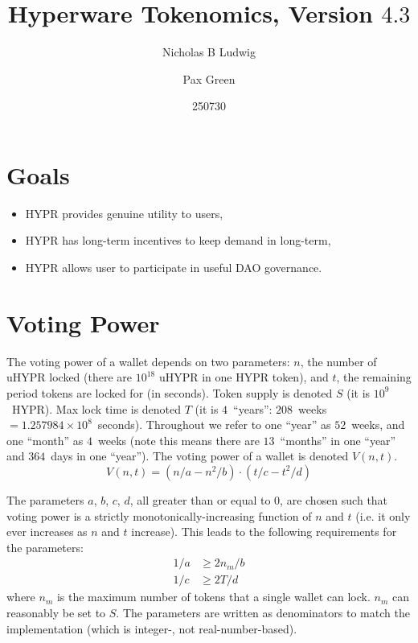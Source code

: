 \documentclass{article}
\title{Hyperware Tokenomics, Version $4.3$}
\date{250730}
\author{Nicholas B Ludwig \and Pax Green}
\begin{document}
\maketitle

\section{Goals}\label{sec:goals}
\begin{itemize}
    \item HYPR provides genuine utility to users,
    \item HYPR has long-term incentives to keep demand in long-term,
    \item HYPR allows user to participate in useful DAO governance.
\end{itemize}

\section{Voting Power}\label{sec:votingpower}

The voting power of a wallet depends on two parameters: $n$, the number of uHYPR locked (there are $10^{18}$ uHYPR in one HYPR token), and $t$, the remaining period tokens are locked for (in seconds).
Token supply is denoted $S$ (it is $10^9$~HYPR).
Max lock time is denoted $T$ (it is $4$~``years'': $208$~weeks $= 1.257984\times 10^8$~seconds).
Throughout we refer to one ``year'' as $52$~weeks, and one ``month'' as $4$~weeks (note this means there are $13$~``months'' in one ``year'' and $364$~days in one ``year'').
The voting power of a wallet is denoted $V(n, t)$.
\begin{equation}
V(n, t) = (n/a - n^2/b) \cdot (t/c - t^2/d)
\end{equation}

The parameters $a$, $b$, $c$, $d$, all greater than or equal to $0$, are chosen such that voting power is a strictly monotonically-increasing function of $n$ and $t$ (i.e. it only ever increases as $n$ and $t$ increase).
This leads to the following requirements for the parameters:
\begin{equation}\label{eq:parameters-extremum}
\begin{aligned}
1/a &\geq 2 n_m / b\\
1/c &\geq 2 T / d
\end{aligned}
\end{equation}
where $n_m$ is the maximum number of tokens that a single wallet can lock.
$n_m$ can reasonably be set to $S$.
The parameters are written as denominators to match the implementation (which is integer-, not real-number-based).
\end{document}
